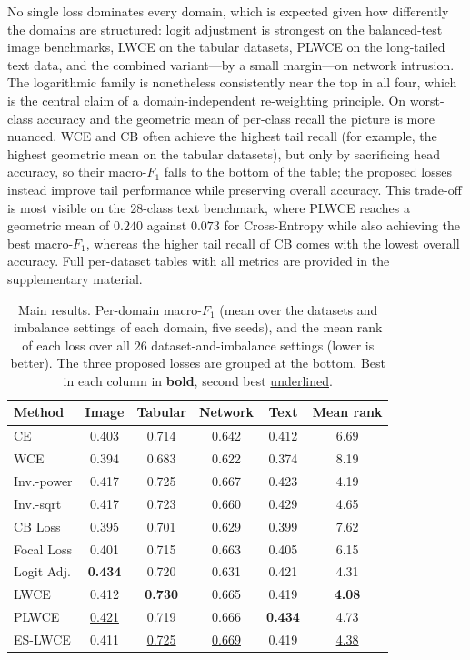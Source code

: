\documentclass[a4paper,fleqn]{cas-sc}
\begin{document}
No single loss dominates every domain, which is expected given how differently the
domains are structured: logit adjustment is strongest on the balanced-test image
benchmarks, LWCE on the tabular datasets, PLWCE on the long-tailed text data, and
the combined variant---by a small margin---on network intrusion. The logarithmic
family is nonetheless consistently near the top in all four, which is the central
claim of a domain-independent re-weighting principle. On worst-class accuracy and
the geometric mean of per-class recall the picture is more nuanced. WCE and CB
often achieve the highest tail recall (for example, the highest geometric mean on
the tabular datasets), but only by sacrificing head accuracy, so their macro-$F_1$
falls to the bottom of the table; the proposed losses instead improve tail
performance while preserving overall accuracy. This trade-off is most visible on the
$28$-class text benchmark, where PLWCE reaches a geometric mean of $0.240$ against
$0.073$ for Cross-Entropy while also achieving the best macro-$F_1$, whereas the
higher tail recall of CB comes with the lowest overall accuracy. Full per-dataset
tables with all metrics are provided in the supplementary material.

\begin{table}[pos=h]
\centering
\caption{Main results. Per-domain macro-$F_1$ (mean over the datasets and imbalance
settings of each domain, five seeds), and the mean rank of each loss over all $26$
dataset-and-imbalance settings (lower is better). The three proposed losses are
grouped at the bottom. Best in each column in \textbf{bold}, second best
\underline{underlined}.}
\label{tab:main}
\begin{tabular}{lccccc}
\toprule
Method & Image & Tabular & Network & Text & Mean rank \\
\midrule
CE            & 0.403 & 0.714 & 0.642 & 0.412 & 6.69 \\
WCE           & 0.394 & 0.683 & 0.622 & 0.374 & 8.19 \\
Inv.-power    & 0.417 & 0.725 & 0.667 & 0.423 & 4.19 \\
Inv.-sqrt     & 0.417 & 0.723 & 0.660 & 0.429 & 4.65 \\
CB Loss       & 0.395 & 0.701 & 0.629 & 0.399 & 7.62 \\
Focal Loss    & 0.401 & 0.715 & 0.663 & 0.405 & 6.15 \\
Logit Adj.    & \textbf{0.434} & 0.720 & 0.631 & 0.421 & 4.31 \\
\midrule
LWCE          & 0.412 & \textbf{0.730} & 0.665 & 0.419 & \textbf{4.08} \\
PLWCE         & \underline{0.421} & 0.719 & 0.666 & \textbf{0.434} & 4.73 \\
ES-LWCE       & 0.411 & \underline{0.725} & \underline{0.669} & 0.419 & \underline{4.38} \\
\bottomrule
\end{tabular}
\end{table}
\end{document}
